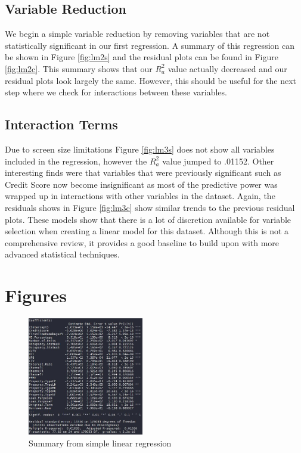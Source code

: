 \documentclass[10pt,twocolumn,letterpaper]{article}
\begin{document}
\subsection{Variable Reduction}

We begin a simple variable reduction by removing variables that are not statistically significant in our first regression. A summary of this regression can be shown in Figure \ref{fig:lm2s} and the residual plots can be found in Figure \ref{fig:lm2c}. This summary shows that our $R^2_a$ value actually decreased and our residual plots look largely the same. However, this should be useful for the next step where we check for interactions between these variables.

\subsection{Interaction Terms}
Due to screen size limitations Figure \ref{fig:lm3s} does not show all variables included in the regression, however the $R^2_a$ value jumped to .01152. Other interesting finds were that variables that were previously significant such as Credit Score now become insignificant as most of the predictive power was wrapped up in interactions with other variables in the dataset. Again, the residuals shows in Figure \ref{fig:lm3c} show similar trends to the previous residual plots. These models show that there is a lot of discretion available for variable selection when creating a linear model for this dataset. Although this is not a comprehensive review, it provides a good baseline to build upon with more advanced statistical techniques.


\section{Figures}

\begin{figure}
	\includegraphics[width=0.45\textwidth]{images/lm1s.jpg}
	\caption{Summary from simple linear regression}
	\label{fig:lm1s}
\end{figure}
\end{document}
